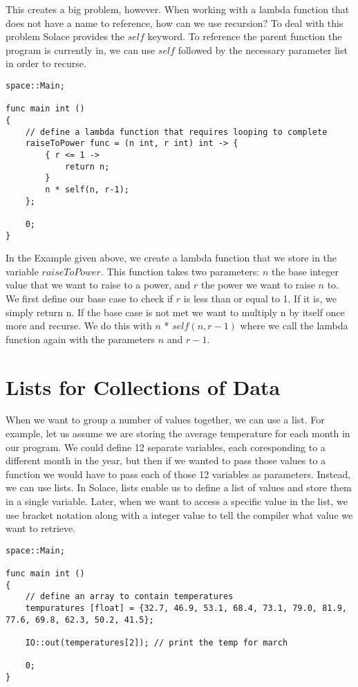 \documentclass{article}
\begin{document}
This creates a big problem, however. When working with a lambda function that does not have a name to reference, how can we use recursion? To deal with this problem
Solace provides the $self$ keyword. To reference the parent function the program is currently in, we can use $self$ followed by the necessary parameter list in order
to recurse.

\begin{lstlisting}
space::Main;

func main int ()
{
	// define a lambda function that requires looping to complete
	raiseToPower func = (n int, r int) int -> {
		{ r <= 1 ->
			return n;
		}
		n * self(n, r-1);
	};

	0;
}
\end{lstlisting}

In the Example given above, we create a lambda function that we store in the variable $raiseToPower$. This function takes two parameters: $n$ the base integer value
that we want to raise to a power, and $r$ the power we want to raise $n$ to. We first define our base case to check if $r$ is less than or equal to 1. If it is,
we simply return n. If the base case is not met we want to multiply n by itself once more and recurse. We do this with $n$ * $self(n,r-1)$ where we call the
lambda function again with the parameters $n$ and $r-1$.


\section{Lists for Collections of Data}

When we want to group a number of values together, we can use a list. For example, let us assume we are storing the average temperature for each month in our program.
We could define 12 separate variables, each coresponding to a different month in the year, but then if we wanted to pass those values to a function we would have to pass
each of those 12 variables as parameters. Instead, we can use lists. In Solace, lists enable us to define a list of values and store them in a single variable.
Later, when we want to access a specific value in the list, we use bracket notation along with a integer value to tell the compiler what value we want to retrieve.

\begin{lstlisting}
space::Main;

func main int ()
{
	// define an array to contain temperatures
	tempuratures [float] = {32.7, 46.9, 53.1, 68.4, 73.1, 79.0, 81.9, 77.6, 69.8, 62.3, 50.2, 41.5};

	IO::out(temperatures[2]); // print the temp for march

	0;
}
\end{lstlisting}
\end{document}
